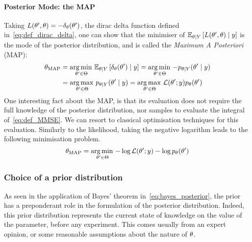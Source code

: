 \documentclass[../../Main_ManuscritThese.tex]{subfiles}
\begin{document}
\paragraph{Posterior Mode: the MAP}
Taking $L(\theta^{\prime},\theta) = -\delta_{\theta}(\theta^{\prime})$, the dirac delta function defined in~\cref{eq:def_dirac_delta}, one can show that the minimiser of $\mathbb{E}_{\theta\mid Y}\left[L(\theta^{\prime},\theta) \mid y\right]$ is the mode of the posterior distribution, and is called the \emph{Maximum A Posteriori} (MAP):
\begin{align}
  \label{eq:def_MAP}
  {\theta}_{\mathrm{MAP}} &= \operatorname*{arg\,min \,}_{\theta^{\prime} \in \Theta}\mathbb{E}_{\theta\mid Y}\left[\delta_{\theta}(\theta^{\prime})\mid y\right] = \operatorname*{arg\,min \,}_{\theta^{\prime} \in \Theta} -p_{\theta\mid Y}(\theta^{\prime}\mid y) \\
                         &= \operatorname*{arg\,max \,}_{\theta^{\prime} \in \Theta} p_{\theta\mid Y}(\theta^{\prime} \mid y) = \operatorname*{arg\,max \,}_{\theta^{\prime} \in \Theta} \mathcal{L}(\theta^{\prime} ;y)p_{\theta}(\theta^{\prime})
                           \nonumber
\end{align}
One interesting fact about the MAP, is that its evaluation does not require the full knowledge of the posterior distribution, nor samples to evaluate the integral of~\cref{eq:def_MMSE}. We can resort to classical optimisation techniques for this evaluation. Similarly to the likelihood, taking the negative logarithm leads to the following minimisation problem.
\begin{equation}
  \label{eq:minimisation_MAP_log}
  {\theta}_{\mathrm{MAP}} = \operatorname*{arg\,min \,}_{\theta^{\prime}\in \Theta} -\log \mathcal{L}(\theta^{\prime};y) - \log p_{\theta}(\theta^{\prime})
\end{equation}

\subsubsection{Choice of a prior distribution}
\label{sec:choice_prior}
As seen in the application of Bayes' theorem
in~\cref{eq:bayes_posterior}, the prior has a preponderant role in the
formulation of the posterior distribution. Indeed, this prior
distribution represents the current state of knowledge on the value of
the parameter, before any experiment. This comes usually from an
expert opinion, or some reasonable assumptions about the nature of
$\theta$.
\end{document}
